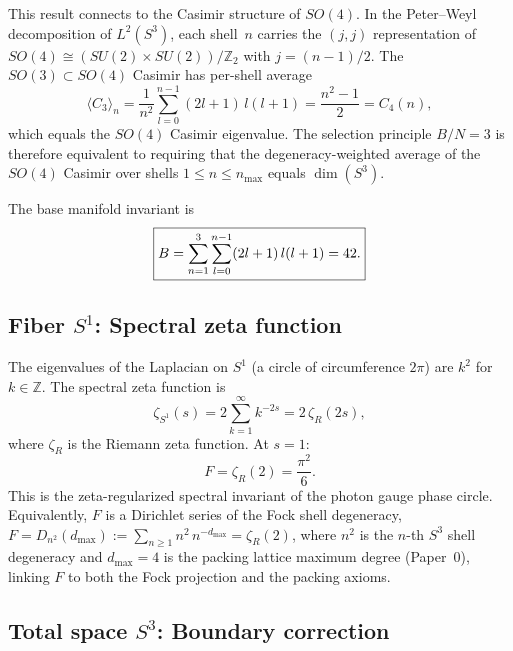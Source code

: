 \documentclass[aps,prl,twocolumn,superscriptaddress]{revtex4-2}
\begin{document}
This result connects to the Casimir structure of $SO(4)$. In the
Peter--Weyl decomposition of $L^2(S^3)$, each shell~$n$ carries the
$(j,j)$ representation of $SO(4) \cong (SU(2) \times SU(2))/\mathbb{Z}_2$
with $j = (n-1)/2$. The $SO(3) \subset SO(4)$ Casimir has per-shell
average
\begin{equation}\label{eq:casimir_identity}
  \langle C_3 \rangle_n
  = \frac{1}{n^2}\sum_{l=0}^{n-1}(2l+1)\,l(l+1)
  = \frac{n^2-1}{2} = C_4(n),
\end{equation}
which equals the $SO(4)$ Casimir eigenvalue. The selection principle
$B/N = 3$ is therefore equivalent to requiring that the
degeneracy-weighted average of the $SO(4)$ Casimir over shells
$1 \leq n \leq n_{\max}$ equals $\dim(S^3)$.

The base manifold invariant is
\begin{equation}\label{eq:base}
  \boxed{B = \sum_{n=1}^{3}\sum_{l=0}^{n-1}(2l+1)\,l(l+1) = 42.}
  \vphantom{\Bigg|}
\end{equation}


\subsection{Fiber $S^1$: Spectral zeta function}

The eigenvalues of the Laplacian on $S^1$ (a circle of circumference
$2\pi$) are $k^2$ for $k \in \mathbb{Z}$. The spectral zeta function
is
\begin{equation}
  \zeta_{S^1}(s) = 2\sum_{k=1}^{\infty} k^{-2s}
                 = 2\,\zeta_R(2s),
\end{equation}
where $\zeta_R$ is the Riemann zeta function. At $s = 1$:
\begin{equation}\label{eq:fiber}
  F = \zeta_R(2) = \frac{\pi^2}{6}.
\end{equation}
This is the zeta-regularized spectral invariant of the photon gauge
phase circle. Equivalently, $F$ is a Dirichlet series of the Fock
shell degeneracy,
$F = D_{n^2}(d_{\max}) := \sum_{n\geq 1} n^2\, n^{-d_{\max}} =
\zeta_R(2)$, where $n^2$ is the $n$-th $S^3$ shell degeneracy and
$d_{\max}=4$ is the packing lattice maximum degree (Paper~0),
linking $F$ to both the Fock projection and the packing axioms.


\subsection{Total space $S^3$: Boundary correction}
\end{document}
